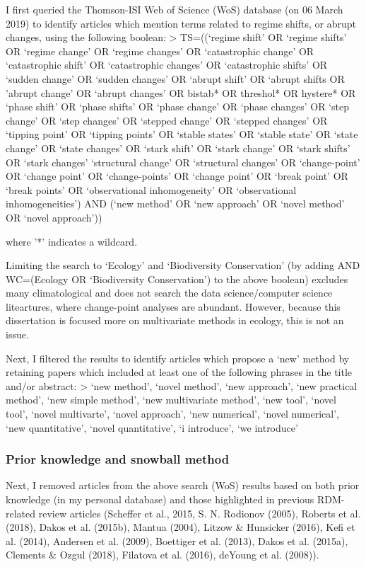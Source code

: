 \documentclass[12pt,twoside,openany]{reedthesis}
\begin{document}
I first queried the Thomson-ISI Web of Science (WoS) database (on 06
March 2019) to identify articles which mention terms related to regime
shifts, or abrupt changes, using the following boolean: \textgreater{}
TS=((`regime shift' OR `regime shifts' OR `regime change' OR `regime
changes' OR `catastrophic change' OR `catastrophic shift' OR
`catastrophic changes' OR `catastrophic shifts' OR `sudden change' OR
`sudden changes' OR `abrupt shift' OR `abrupt shifts OR 'abrupt change'
OR `abrupt changes' OR bistab* OR threshol* OR hystere* OR `phase shift'
OR `phase shifts' OR `phase change' OR `phase changes' OR `step change'
OR `step changes' OR `stepped change' OR `stepped changes' OR `tipping
point' OR `tipping points' OR `stable states' OR `stable state' OR
`state change' OR `state changes' OR `stark shift' OR `stark change' OR
`stark shifts' OR `stark changes' `structural change' OR `structural
changes' OR `change-point' OR `change point' OR `change-points' OR
`change point' OR `break point' OR `break points' OR `observational
inhomogeneity' OR `observational inhomogeneities') AND (`new method' OR
`new approach' OR `novel method' OR `novel approach'))

where '*' indicates a wildcard.

Limiting the search to `Ecology' and `Biodiversity Conservation' (by
adding AND WC=(Ecology OR `Biodiversity Conservation') to the above
boolean) excludes many climatological and does not search the data
science/computer science liteartures, where change-point analyses are
abundant. However, because this dissertation is focused more on
multivariate methods in ecology, this is not an issue.

Next, I filtered the results to identify articles which propose a `new'
method by retaining papers which included at least one of the following
phrases in the title and/or abstract: \textgreater{} `new method',
`novel method', `new approach', `new practical method', `new simple
method', `new multivariate method', `new tool', `novel tool', `novel
multivarte', `novel approach', `new numerical', `novel numerical', `new
quantitative', `novel quantitative', `i introduce', `we introduce'

\subsubsection{Prior knowledge and snowball
method}\label{prior-knowledge-and-snowball-method}

Next, I removed articles from the above search (WoS) results based on
both prior knowledge (in my personal database) and those highlighted in
previous RDM-related review articles (Scheffer et al., 2015, S. N.
Rodionov (2005), Roberts et al. (2018), Dakos et al. (2015b), Mantua
(2004), Litzow \& Hunsicker (2016), Kefi et al. (2014), Andersen et al.
(2009), Boettiger et al. (2013), Dakos et al. (2015a), Clements \& Ozgul
(2018), Filatova et al. (2016), deYoung et al. (2008)).
\end{document}
